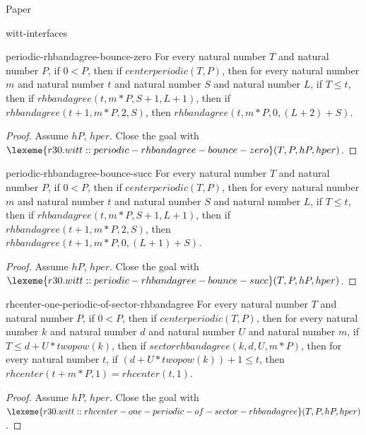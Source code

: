 \begin{lexlean}{Paper}
\begin{section}{witt-interfaces}
  \begin{theorem}{periodic-rhbandagree-bounce-zero}
  For every natural number \(T\) and natural number \(P\), if \(0 < P\), then if \(centerperiodic(T, P)\), then for every natural number \(m\) and natural number \(t\) and natural number \(S\) and natural number \(L\), if \(T ≤ t\), then if \(rhbandagree(t, m * P, S + 1, L + 1)\), then if \(rhbandagree(t + 1, m * P, 2, S)\), then \(rhbandagree(t, m * P, 0, (L + 2) + S)\).
  \begin{proof}
  Assume \(hP\), \(hper\).
  Close the goal with \(\lexeme{r30.witt::periodic-rhbandagree-bounce-zero}(T, P, hP, hper)\).
  \end{proof}
  \end{theorem}

  \begin{theorem}{periodic-rhbandagree-bounce-succ}
  For every natural number \(T\) and natural number \(P\), if \(0 < P\), then if \(centerperiodic(T, P)\), then for every natural number \(m\) and natural number \(t\) and natural number \(S\) and natural number \(L\), if \(T ≤ t\), then if \(rhbandagree(t, m * P, S + 1, L + 1)\), then if \(rhbandagree(t + 1, m * P, 2, S)\), then \(rhbandagree(t + 1, m * P, 0, (L + 1) + S)\).
  \begin{proof}
  Assume \(hP\), \(hper\).
  Close the goal with \(\lexeme{r30.witt::periodic-rhbandagree-bounce-succ}(T, P, hP, hper)\).
  \end{proof}
  \end{theorem}

  \begin{theorem}{rhcenter-one-periodic-of-sector-rhbandagree}
  For every natural number \(T\) and natural number \(P\), if \(0 < P\), then if \(centerperiodic(T, P)\), then for every natural number \(k\) and natural number \(d\) and natural number \(U\) and natural number \(m\), if \(T ≤ d + U * twopow(k)\), then if \(sectorrhbandagree(k, d, U, m * P)\), then for every natural number \(t\), if \((d + U * twopow(k)) + 1 ≤ t\), then \(rhcenter(t + m * P, 1) = rhcenter(t, 1)\).
  \begin{proof}
  Assume \(hP\), \(hper\).
  Close the goal with \(\lexeme{r30.witt::rhcenter-one-periodic-of-sector-rhbandagree}(T, P, hP, hper)\).
  \end{proof}
  \end{theorem}


\end{section}
\end{lexlean}
